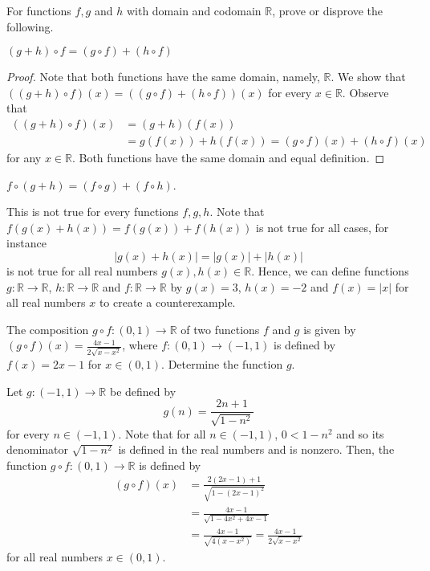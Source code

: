 \documentclass[12pt]{article}
\newcommand{\R}{\mathbb{R}}
\newcommand{\Abs}[1]{\left\vert #1 \right\vert}
\newenvironment{problem}[2][Problem]{\begin{trivlist} \item[\hskip \labelsep {\bfseries #1}\hskip \labelsep {\bfseries #2.}]}{\end{trivlist}}
\newenvironment{solution}[1][Solution]{\begin{trivlist} \item[\hskip \labelsep {\bfseries #1}]}{\end{trivlist}}
\begin{document}
    \begin{problem}{47}
      For functions $f,g$ and $h$ with domain and codomain $\R$, prove or disprove the following.
    \begin{enumerate}
      \item $(g+h)\circ f = (g\circ f)+(h\circ f)$
    \begin{proof}
      Note that both functions have the same domain, namely, $\R$. We show that $((g+h)\circ f)(x) = ((g\circ f)+(h\circ f))(x)$ for every $x\in \R$. Observe that
    \begin{align*}
      \left( \left( g+h \right)\circ f \right)(x) &= (g+h)(f(x))\\
      &= g(f(x)) + h(f(x)) = (g\circ f)(x) + (h\circ f)(x)
    \end{align*}
    for any $x\in \R$. Both functions have the same domain and equal definition. 
    \end{proof}
      \item $f\circ (g+h) = (f\circ g) + (f\circ h)$.
    \begin{solution}
      This is not true for every functions $f,g,h$. Note that $f(g(x)+h(x)) = f(g(x)) +f(h(x))$ is not true for all cases, for instance 
    \begin{equation*}
      \Abs{g(x) + h(x)} = \Abs{g(x)} + \Abs{h(x)}
    \end{equation*}
    is not true for all real numbers $g(x),h(x) \in \R$. Hence, we can define functions $g:\R \to \R$, $h:\R\to \R$ and $f:\R\to \R$ by $g(x) = 3$, $h(x) = -2$ and $f(x) = \Abs{x}$ for all real numbers $x$ to create a counterexample.
    \end{solution}
    \end{enumerate}
    \end{problem}
    \begin{problem}{48}
      The composition $g\circ f: (0,1) \to \R$ of two functions $f$ and $g$ is given by $(g\circ f)(x) = \frac{4x-1}{2\sqrt{x-x^{2}}}$, where $f:(0,1)\to (-1,1)$ is defined by $f(x) = 2x-1$ for $x\in (0,1)$. Determine the function $g$.
    \begin{solution}
      Let $g: (-1,1) \to \R$ be defined by
    \begin{equation*}
      g(n) = \frac{2n+1}{\sqrt{1-n^{2}}}
    \end{equation*}
    for every $n\in (-1,1)$. Note that for all $n\in (-1,1)$, $0<1-n^{2}$ and so its denominator $\sqrt{1-n^{2}}$ is defined in the real numbers and is nonzero. Then, the function $g\circ f: (0,1) \to \R$ is defined by 
    \begin{align*}
      (g\circ f)(x) &= \frac{2(2x-1)+1}{\sqrt{1-(2x-1)^{2}}}\\
	&= \frac{4x-1}{\sqrt{1-4x^{2}+4x-1}}\\
	  &= \frac{4x-1}{\sqrt{4(x-x^{2})}} = \frac{4x-1}{2\sqrt{x-x^{2}}}
    \end{align*}
    for all real numbers $x\in (0,1)$.
    \end{solution}
    \end{problem}
    
\end{document}
